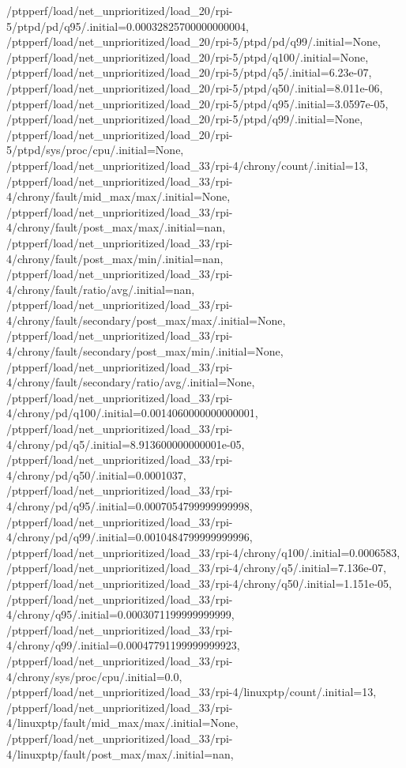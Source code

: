 {    /ptpperf/load/net_unprioritized/load_20/rpi-5/ptpd/pd/q95/.initial=0.00032825700000000004,
    /ptpperf/load/net_unprioritized/load_20/rpi-5/ptpd/pd/q99/.initial=None,
    /ptpperf/load/net_unprioritized/load_20/rpi-5/ptpd/q100/.initial=None,
    /ptpperf/load/net_unprioritized/load_20/rpi-5/ptpd/q5/.initial=6.23e-07,
    /ptpperf/load/net_unprioritized/load_20/rpi-5/ptpd/q50/.initial=8.011e-06,
    /ptpperf/load/net_unprioritized/load_20/rpi-5/ptpd/q95/.initial=3.0597e-05,
    /ptpperf/load/net_unprioritized/load_20/rpi-5/ptpd/q99/.initial=None,
    /ptpperf/load/net_unprioritized/load_20/rpi-5/ptpd/sys/proc/cpu/.initial=None,
    /ptpperf/load/net_unprioritized/load_33/rpi-4/chrony/count/.initial=13,
    /ptpperf/load/net_unprioritized/load_33/rpi-4/chrony/fault/mid_max/max/.initial=None,
    /ptpperf/load/net_unprioritized/load_33/rpi-4/chrony/fault/post_max/max/.initial=nan,
    /ptpperf/load/net_unprioritized/load_33/rpi-4/chrony/fault/post_max/min/.initial=nan,
    /ptpperf/load/net_unprioritized/load_33/rpi-4/chrony/fault/ratio/avg/.initial=nan,
    /ptpperf/load/net_unprioritized/load_33/rpi-4/chrony/fault/secondary/post_max/max/.initial=None,
    /ptpperf/load/net_unprioritized/load_33/rpi-4/chrony/fault/secondary/post_max/min/.initial=None,
    /ptpperf/load/net_unprioritized/load_33/rpi-4/chrony/fault/secondary/ratio/avg/.initial=None,
    /ptpperf/load/net_unprioritized/load_33/rpi-4/chrony/pd/q100/.initial=0.0014060000000000001,
    /ptpperf/load/net_unprioritized/load_33/rpi-4/chrony/pd/q5/.initial=8.913600000000001e-05,
    /ptpperf/load/net_unprioritized/load_33/rpi-4/chrony/pd/q50/.initial=0.0001037,
    /ptpperf/load/net_unprioritized/load_33/rpi-4/chrony/pd/q95/.initial=0.0007054799999999998,
    /ptpperf/load/net_unprioritized/load_33/rpi-4/chrony/pd/q99/.initial=0.0010484799999999996,
    /ptpperf/load/net_unprioritized/load_33/rpi-4/chrony/q100/.initial=0.0006583,
    /ptpperf/load/net_unprioritized/load_33/rpi-4/chrony/q5/.initial=7.136e-07,
    /ptpperf/load/net_unprioritized/load_33/rpi-4/chrony/q50/.initial=1.151e-05,
    /ptpperf/load/net_unprioritized/load_33/rpi-4/chrony/q95/.initial=0.0003071199999999999,
    /ptpperf/load/net_unprioritized/load_33/rpi-4/chrony/q99/.initial=0.00047791199999999923,
    /ptpperf/load/net_unprioritized/load_33/rpi-4/chrony/sys/proc/cpu/.initial=0.0,
    /ptpperf/load/net_unprioritized/load_33/rpi-4/linuxptp/count/.initial=13,
    /ptpperf/load/net_unprioritized/load_33/rpi-4/linuxptp/fault/mid_max/max/.initial=None,
    /ptpperf/load/net_unprioritized/load_33/rpi-4/linuxptp/fault/post_max/max/.initial=nan,
}
